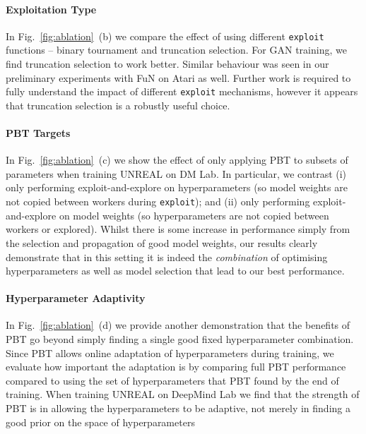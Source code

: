 \documentclass{article} %
\newcommand{\figref}[1]{Fig.~\ref{#1}}
\newcommand{\pbtexploit}{\texttt{exploit}\xspace}
\begin{document}
\paragraph{Exploitation Type}\label{sec:analysis_exploit}

In \figref{fig:ablation}~(b) we compare the effect of using different \pbtexploit functions -- binary tournament and truncation selection. For GAN training, we find truncation selection to work better. Similar behaviour was seen in our preliminary experiments with FuN on Atari as well.
Further work is required to fully understand the impact of different \pbtexploit mechanisms, however it appears that truncation selection is a robustly useful choice.


\paragraph{PBT Targets}\label{sec:analysis_pbt_targets}

In \figref{fig:ablation}~(c) we show the effect of only applying PBT to subsets of parameters when training UNREAL on DM Lab. In particular, we contrast (i) only performing exploit-and-explore on hyperparameters (so model weights are not copied between workers during \pbtexploit); and (ii) only performing exploit-and-explore on model weights (so hyperparameters are not copied between workers or explored). Whilst there is some increase in performance simply from the selection and propagation of good model weights, our results clearly demonstrate that in this setting it is indeed the \emph{combination} of optimising hyperparameters as well as model selection that lead to our best performance.

\paragraph{Hyperparameter Adaptivity}\label{sec:analysis_hyper_adapt}

In \figref{fig:ablation}~(d) we provide another demonstration that the benefits of PBT go beyond simply finding a single good fixed hyperparameter combination. Since PBT allows online adaptation of hyperparameters during training, we evaluate how important the adaptation is by comparing full PBT performance compared to using the set of hyperparameters that PBT found by the end of training. When training UNREAL on DeepMind Lab we find that the strength of PBT is in allowing the hyperparameters to be adaptive, not merely in finding a good prior on the space of hyperparameters
\end{document}
